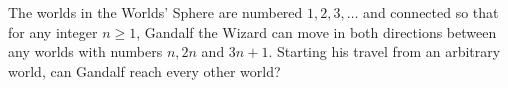 The worlds in the Worlds’ Sphere are numbered $1,2,3,\ldots $ and connected so that for any integer $n\ge 1$,  Gandalf the Wizard can move in both directions between any worlds with numbers $n,2n$ and $3n+1$. Starting his travel from an arbitrary world, can Gandalf reach every other world?